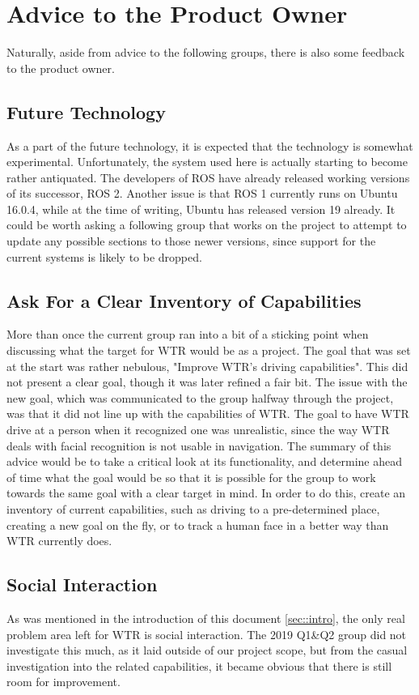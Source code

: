 \section{Advice to the Product Owner}
Naturally, aside from advice to the following groups, there is also some feedback to the product owner.

\subsection{Future Technology}
As a part of the future technology, it is expected that the technology is somewhat experimental.
Unfortunately, the system used here is actually starting to become rather antiquated.
The developers of ROS have already released working versions of its successor, ROS 2.
Another issue is that ROS 1 currently runs on Ubuntu 16.0.4, while at the time of writing, Ubuntu has released version 19 already.
It could be worth asking a following group that works on the project to attempt to update any possible sections to those newer versions, since support for the current systems is likely to be dropped.

\subsection{Ask For a Clear Inventory of Capabilities}
More than once the current group ran into a bit of a sticking point when discussing what the target for WTR would be as a project.
The goal that was set at the start was rather nebulous,  "Improve WTR's driving capabilities".
This did not present a clear goal, though it was later refined a fair bit.
The issue with the new goal, which was communicated to the group halfway through the project, was that it did not line up with the capabilities of WTR.
The goal to have WTR drive at a person when it recognized one was unrealistic, since the way WTR deals with facial recognition is not usable in navigation.
The summary of this advice would be to take a critical look at its functionality, and determine ahead of time what the goal would be so that it is possible for the group to work towards the same goal with a clear target in mind.
In order to do this, create an inventory of current capabilities, such as driving to a pre-determined place, creating a new goal on the fly, or to track a human face in a better way than WTR currently does.

\subsection{Social Interaction}
As was mentioned in the introduction of this document \ref{sec::intro}, the only real problem area left for WTR is social interaction.
The 2019 Q1\&Q2 group did not investigate this much, as it laid outside of our project scope, but from the casual investigation into the related capabilities, it became obvious that there is still room for improvement.

